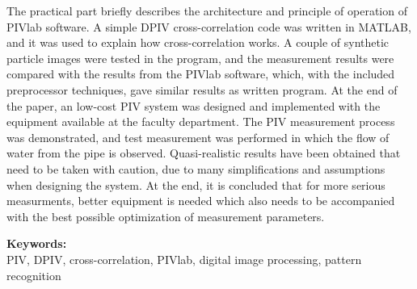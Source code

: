 \par
The practical part briefly describes the architecture and principle of operation of PIVlab software. A simple DPIV cross-correlation code was written in MATLAB, and it was used to explain how cross-correlation works. A couple of synthetic particle images were tested in the program, and the measurement results were compared with the results from the PIVlab software, which, with the included preprocessor techniques, gave similar results as written program. At the end of the paper, an low-cost PIV system was designed and implemented with the equipment available at the faculty department. The PIV measurement process was demonstrated, and test measurement was performed in which the flow of water from the pipe is observed. Quasi-realistic results have been obtained that need to be taken with caution, due to many simplifications and assumptions when designing the system. At the end, it is concluded that for more serious measurments, better equipment is needed which also needs to be accompanied with the best possible optimization of measurement parameters.

\vskip 3mm
\begin{flushleft}	
	{
		\normalsize{\bf{Keywords:\\}}
		\textnormal{PIV, DPIV, cross-correlation, PIVlab, digital image processing, pattern recognition}
	}	
\end{flushleft}
